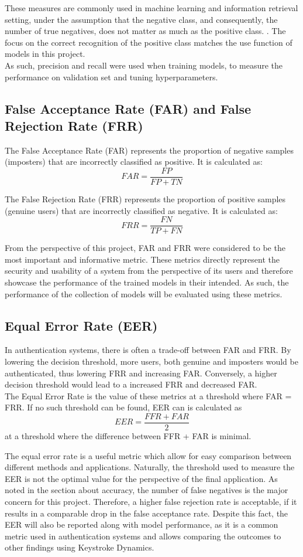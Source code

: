 These measures are commonly used in machine learning and information retrieval setting, under the assumption that the negative class, and consequently, the number of true negatives, does not matter as much as the positive class. . The focus on the correct recognition of the positive class matches the use function of models in this project.\\
As such, precision and recall were used when training models, to measure the performance on validation set and tuning hyperparameters.

\subsection{False Acceptance Rate (FAR) and False Rejection Rate (FRR)} \label{FAR_FRR_theory}
The False Acceptance Rate (FAR) represents the proportion of negative samples (imposters) that are incorrectly classified as positive. It is calculated as:
\[
FAR = \frac{FP}{FP + TN}
\]

The False Rejection Rate (FRR) represents the proportion of positive samples (genuine users) that are incorrectly classified as negative. It is calculated as:
\[
FRR = \frac{FN}{TP + FN}
\]

From the perspective of this project, FAR and FRR were considered to be the most important and informative metric. These metrics directly represent the security and usability of a system from the perspective of its users and therefore showcase the performance of the trained models in their intended. As such, the performance of the collection of models will be evaluated using these metrics. 

\subsection{Equal Error Rate (EER)}
In authentication systems, there is often a trade-off between FAR and FRR. By lowering the decision threshold, more users, both genuine and imposters would be authenticated, thus lowering FRR and increasing FAR. Conversely, a higher decision threshold would lead to a increased FRR and decreased FAR. \\
The Equal Error Rate is the value of these metrics at a threshold where FAR = FRR. If no such threshold can be found, EER can is calculated as  
\[
EER = \frac{FFR + FAR}{2}
\]
at a threshold where the difference between FFR + FAR is minimal.

The equal error rate is a useful metric which allow for easy comparison between different methods and applications. Naturally, the threshold used to measure the EER is not the optimal value for the perspective of the final application. As noted in the section about accuracy, the number of false negatives is the major concern for this project. Therefore, a higher false rejection rate is acceptable, if it results in a comparable drop in the false acceptance rate. Despite this fact, the EER will also be reported along with model performance, as it is a common metric used in authentication systems and allows comparing the outcomes to other findings using Keystroke Dynamics.
